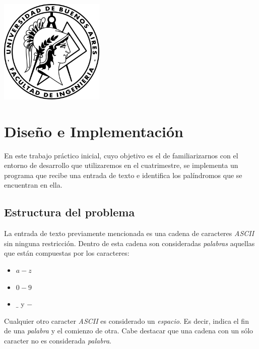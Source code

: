 \documentclass[a4paper, 10pt]{article}
\newcommand\tab[1][0.5cm]{\hspace*{#1}}
\begin{document}
    \newpage

    \begin{center}
        \includegraphics[width=5cm, height=5cm]{images/logo}
    \end{center}


    \maketitle
    \newpage
    \tableofcontents
    \newpage
	\section{Diseño e Implementación}
		En este trabajo práctico inicial, cuyo objetivo es el de familiarizarnos con el
		entorno de desarrollo que utilizaremos en el cuatrimestre, se implementa un programa
		que recibe una entrada de texto e identifica los palíndromos que se encuentran en
		ella.
		\subsection{Estructura del problema}
			La entrada de texto previamente mencionada es una cadena de caracteres \emph{ASCII}
			sin ninguna restricción. Dentro de esta cadena son consideradas \emph{palabras} aquellas
			que están compuestas por los caracteres:
			\begin{itemize}
				\item $a-z$
				\item $0-9$
				\item $\_$ y $-$
			\end{itemize}
			\tab Cualquier otro caracter \emph{ASCII} es considerado un \emph{espacio}. Es decir,
			indica el fin de una \emph{palabra} y el comienzo de otra. Cabe destacar que una cadena
			con un sólo caracter no es considerada \emph{palabra}.
\end{document}
